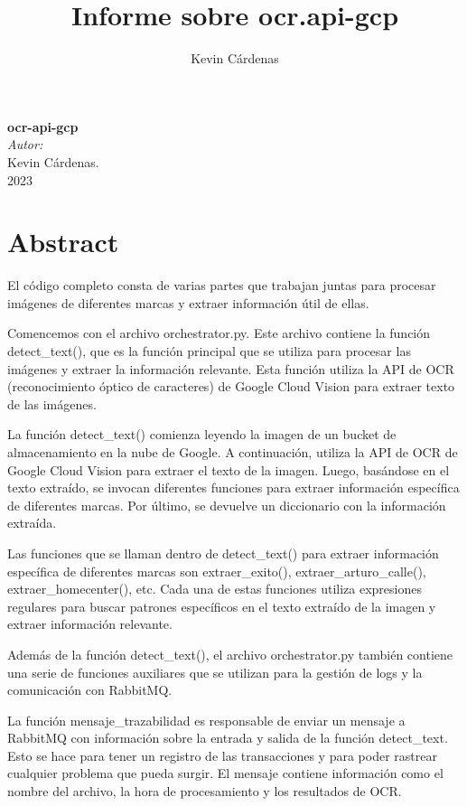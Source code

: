 \documentclass{article}
\title{Informe sobre ocr.api-gcp}
\author{Kevin Cárdenas}
\begin{document}
\begin{titlepage}
    \begin{center}
        {\Huge \textbf{ocr-api-gcp}}
        \\[18cm]

        \large\emph{Autor:}\\
        Kevin Cárdenas.
        \\[1cm]
        {\large 2023}
    \end{center}
\end{titlepage}

\newpage
\tableofcontents
\newpage
\section{Abstract}
El código completo consta de varias partes que trabajan juntas para procesar imágenes de diferentes marcas y extraer información útil de ellas.

Comencemos con el archivo orchestrator.py. Este archivo contiene la función detect\_text(), que es la función principal que se utiliza para procesar las imágenes y extraer la información relevante. Esta función utiliza la API de OCR (reconocimiento óptico de caracteres) de Google Cloud Vision para extraer texto de las imágenes.

La función detect\_text() comienza leyendo la imagen de un bucket de almacenamiento en la nube de Google. A continuación, utiliza la API de OCR de Google Cloud Vision para extraer el texto de la imagen. Luego, basándose en el texto extraído, se invocan diferentes funciones para extraer información específica de diferentes marcas. Por último, se devuelve un diccionario con la información extraída.

Las funciones que se llaman dentro de detect\_text() para extraer información específica de diferentes marcas son extraer\_exito(), extraer\_arturo\_calle(), extraer\_homecenter(), etc. Cada una de estas funciones utiliza expresiones regulares para buscar patrones específicos en el texto extraído de la imagen y extraer información relevante.

Además de la función detect\_text(), el archivo orchestrator.py también contiene una serie de funciones auxiliares que se utilizan para la gestión de logs y la comunicación con RabbitMQ.

La función mensaje\_trazabilidad es responsable de enviar un mensaje a RabbitMQ con información sobre la entrada y salida de la función detect\_text. Esto se hace para tener un registro de las transacciones y para poder rastrear cualquier problema que pueda surgir. El mensaje contiene información como el nombre del archivo, la hora de procesamiento y los resultados de OCR.
\end{document}
